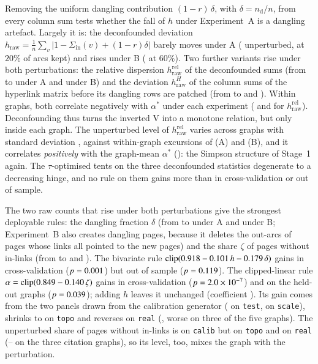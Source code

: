 \documentclass[11pt,a4paper]{article}
\theoremstyle{definition}
\theoremstyle{remark}
\newcommand{\Sin}{\Sigma_{\mathrm{in}}}
\newcommand{\clip}{\mathrm{clip}}
\begin{document}
Removing the uniform dangling contribution $(1-r)\,\delta$, with $\delta=n_{\mathrm d}/n$, from every
column sum tests whether the fall of $h$ under Experiment~A is a dangling artefact. Largely it is: the
deconfounded deviation $h_{\mathrm{raw}}=\frac1n\sum_v|1-\Sin(v)+(1-r)\delta|$ barely moves under A
(\NmHrawFull{} unperturbed, \NmHrawSevA{} at $20\%$ of arcs kept) and rises under B (\NmHrawSevB{} at
$60\%$). Two further variants rise under both perturbations: the relative dispersion
$h_{\mathrm{raw}}^{\mathrm{rel}}$ of the deconfounded sums (from \NmHrelFull{} to \NmHrelSevA{} under A
and \NmHrelSevB{} under B) and the deviation $h_{\mathrm{raw}}^{H}$ of the column sums of the hyperlink
matrix before its dangling rows are patched (from \NmHHFull{} to \NmHHSevA{} and \NmHHSevB). Within
graphs, both correlate negatively with $\alpha^*$ under each experiment (\NmHrelAstarA{} and
\NmHrelAstarB{} for $h_{\mathrm{raw}}^{\mathrm{rel}}$). Deconfounding thus turns the inverted V into a
monotone relation, but only inside each graph. The unperturbed level of $h_{\mathrm{raw}}^{\mathrm{rel}}$
varies across graphs with standard deviation \NmRelSd, against within-graph excursions of \NmRelExcA{}
(A) and \NmRelExcB{} (B), and it correlates \emph{positively} with the graph-mean $\alpha^*$
(\NmRelBetween): the Simpson structure of Stage~1 again. The $\tau$-optimised tents on the three
deconfounded statistics degenerate to a decreasing hinge, and no rule on them gains more than
\NmRawMaxCV{} in cross-validation or \NmRawMaxHeld{} out of sample.

The two raw counts that rise under both perturbations give the strongest deployable rules: the dangling
fraction $\delta$ (from \NmDangFull{} to \NmDangSevA{} under A and \NmDangSevB{} under B; Experiment~B
also creates dangling pages, because it deletes the out-arcs of pages whose links all pointed to the new
pages) and the share $\zeta$ of pages without in-links (from \NmZinFull{} to \NmZinSevA{} and
\NmZinSevB). The bivariate rule $\clip(\NmBilinDeltaA\NmBilinDeltaH\,h\NmBilinDeltaD\,\delta)$ gains
\NmBilinCV{} in cross-validation ($p=0.001$) but \NmBilinHeld{} out of sample
($p=0.119$). The clipped-linear rule $\alpha=\clip(\NmZetaA\NmZetaB\,\zeta)$ gains \NmZetaCV{}
in cross-validation ($p=2.0\times10^{-7}$) and \NmZetaHeld{} on the held-out graphs ($p=0.039$);
adding $h$ leaves it unchanged (coefficient \NmBilinZetaH). Its gain comes from the two panels drawn from
the calibration generator (\NmZetaTest{} on \texttt{test}, \NmZetaScale{} on \texttt{scale}), shrinks to
\NmZetaTopo{} on \texttt{topo} and reverses on \texttt{real} (\NmZetaReal, worse on three of the five
graphs). The unperturbed share of pages without in-links is \NmZinUnpertCalib{} on \texttt{calib} but
\NmZinUnpertTopo{} on \texttt{topo} and \NmZinUnpertReal{} on \texttt{real} (\NmZinCiteMin--\NmZinCiteMax{}
on the three citation graphs), so its level, too, mixes the graph with the perturbation.
\end{document}
